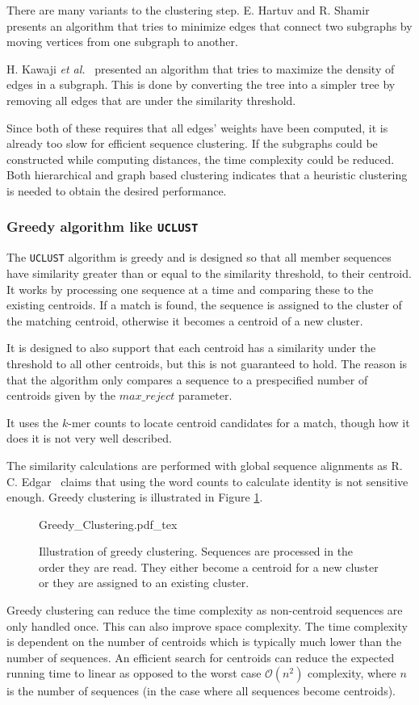 There are many variants to the clustering step. E. Hartuv and R.
Shamir~\cite{hartuv} presents an algorithm that tries to minimize edges that
connect two subgraphs by moving vertices from one subgraph to another.

H. Kawaji \textit{et al.}~\cite{kawaji} presented an algorithm that tries to
maximize the density of edges in a subgraph. This is done by converting the
tree into a simpler tree by removing all edges that are under the similarity
threshold.

Since both of these requires that all edges' weights have been computed, it is
already too slow for efficient sequence clustering. If the subgraphs could be
constructed while computing distances, the time complexity could be reduced.
Both hierarchical and graph based clustering indicates that a heuristic
clustering is needed to obtain the desired performance.


\subsubsection{Greedy algorithm like \texttt{UCLUST}}

The \texttt{UCLUST} algorithm is greedy and is designed so that all member
sequences have similarity greater than or equal to the similarity threshold,
to their centroid.  It works by processing one sequence at a time and
comparing these to the existing centroids. If a match is found, the sequence
is assigned to the cluster of the matching centroid, otherwise it becomes a
centroid of a new cluster.

It is designed to also support that each centroid has a similarity under the
threshold to all other centroids, but this is not guaranteed to hold. The
reason is that the algorithm only compares a sequence to a prespecified number
of centroids given by the $max\_reject$ parameter.

It uses the $k$-mer counts to locate centroid candidates for a match, though
how it does it is not very well described.

The similarity calculations are performed with global sequence alignments as R.
C. Edgar~\cite{usearch_algorithm}  claims that using the word counts to
calculate identity is not sensitive enough. Greedy clustering is illustrated in
Figure \ref{fig:greedy_clustering}.

\begin{figure}[H]
  \def\svgwidth{\columnwidth}
  {Greedy_Clustering.pdf_tex}
  \caption{Illustration of greedy clustering. Sequences are processed in the
    order they are read. They either become a centroid for a new cluster or
    they are assigned to an existing cluster.}
  \label{fig:greedy_clustering}
\end{figure}

Greedy clustering can reduce the time complexity as non-centroid sequences are
only handled once. This can also improve space complexity. The time complexity
is dependent on the number of centroids which is typically much lower than the
number of sequences. An efficient search for centroids can reduce the expected
running time to linear as opposed to the worst case $\mathcal{O}(n^2)$
complexity, where $n$ is the number of sequences (in the case where all
sequences become centroids).

